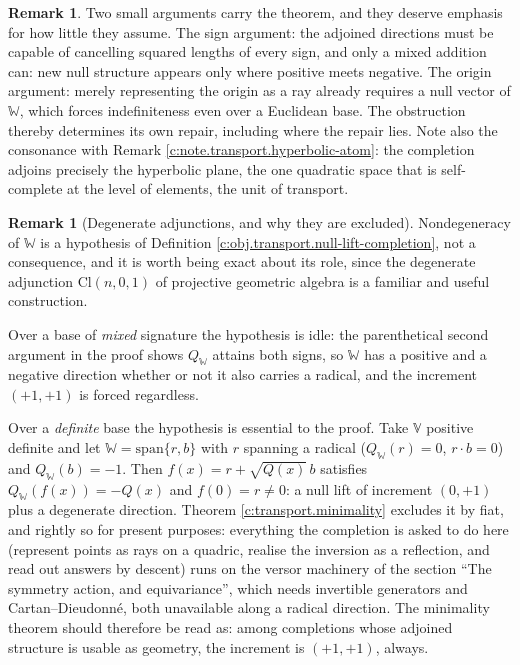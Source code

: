 \documentclass[11pt]{article}
\theoremstyle{definition}
\newtheorem{remark}[theorem]{Remark}
\theoremstyle{plain}
\providecommand{\Cl}{}\renewcommand{\Cl}{\mathrm{Cl}}
\begin{document}
\begin{remark}\label{c:note.transport.signargument}
Two small arguments carry the theorem, and they deserve emphasis for how little they assume. The sign argument: the adjoined directions must be capable of cancelling squared lengths of every sign, and only a mixed addition can: new null structure appears only where positive meets negative. The origin argument: merely representing the origin as a ray already requires a null vector of $\mathbb{W}$, which forces indefiniteness even over a Euclidean base. The obstruction thereby determines its own repair, including where the repair lies. Note also the consonance with Remark \ref{c:note.transport.hyperbolic-atom}: the completion adjoins precisely the hyperbolic plane, the one quadratic space that is self-complete at the level of elements, the unit of transport.
\end{remark}

\begin{remark}[Degenerate adjunctions, and why they are excluded]\label{c:note.transport.degenerate-adjunctions-why-they-are-excluded}
Nondegeneracy of $\mathbb{W}$ is a hypothesis of Definition \ref{c:obj.transport.null-lift-completion}, not a consequence, and it is worth being exact about its role, since the degenerate adjunction $\Cl(n,0,1)$ of projective geometric algebra is a familiar and useful construction.

Over a base of \emph{mixed} signature the hypothesis is idle: the parenthetical second argument in the proof shows $Q_{\mathbb{W}}$ attains both signs, so $\mathbb{W}$ has a positive and a negative direction whether or not it also carries a radical, and the increment $(+1,+1)$ is forced regardless.

Over a \emph{definite} base the hypothesis is essential to the proof. Take $\mathbb{V}$ positive definite and let $\mathbb{W} = \mathrm{span}\{r, b\}$ with $r$ spanning a radical ($Q_{\mathbb{W}}(r) = 0$, $r \cdot b = 0$) and $Q_{\mathbb{W}}(b) = -1$. Then $f(x) = r + \sqrt{Q(x)}\,b$ satisfies $Q_{\mathbb{W}}(f(x)) = -Q(x)$ and $f(0) = r \neq 0$: a null lift of increment $(0,+1)$ plus a degenerate direction. Theorem \ref{c:transport.minimality} excludes it by fiat, and rightly so for present purposes: everything the completion is asked to do here (represent points as rays on a quadric, realise the inversion as a reflection, and read out answers by descent) runs on the versor machinery of the section ``The symmetry action, and equivariance'', which needs invertible generators and Cartan--Dieudonn\'e, both unavailable along a radical direction. The minimality theorem should therefore be read as: among completions whose adjoined structure is usable as geometry, the increment is $(+1,+1)$, always.
\end{remark}
\end{document}
